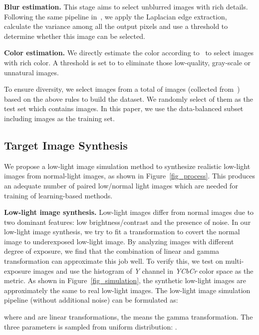 {\bf Blur estimation.} This stage aims to select unblurred images with rich details. Following the same pipeline in~\cite{pech2000diatom}, we apply the Laplacian edge extraction, calculate the variance among all the output pixels and use a threshold  to determine whether this image can be selected.

{\bf Color estimation.} We directly estimate the color according to~\cite{hasler2003measuring} to select images with rich color. A threshold is set to  to eliminate those low-quality, gray-scale or unnatural images.

To ensure diversity, we select  images from a total of  images (collected from~\cite{bileschi2006streetscenes,everingham2010pascal,grubinger2006iapr,lin2014microsoft}) based on the above rules to build the dataset. We randomly select  of them as the test set which contains  images. In this paper, we use the data-balanced subset including  images as the training set.

\subsection{Target Image Synthesis}
We propose a low-light image simulation method to synthesize realistic low-light images from normal-light images, as shown in Figure~\ref{fig_process}. This produces an adequate number of paired low/normal light images which are needed for training of learning-based methods.

{\bf Low-light image synthesis.} Low-light images differ from normal images due to two dominant features: low brightness/contrast and the presence of noise. In our low-light image synthesis, we try to fit a transformation to covert the normal image to underexposed low-light image. By analyzing images with different degree of exposure, we find that the combination of linear and gamma transformation can approximate this job well. To verify this, we test on multi-exposure images and use the histogram of \textit{Y} channel in \textit{YCbCr} color space as the metric. As shown in Figure~\ref{fig_simulation}, the synthetic low-light images are approximately the same to real low-light images. The low-light image simulation pipeline (without additional noise) can be formulated as:
\begin{shrinkeq}{0ex}{
		
}\end{shrinkeq}
where  and  are linear transformations, the  means the gamma transformation. The three parameters is sampled from uniform distribution: .

